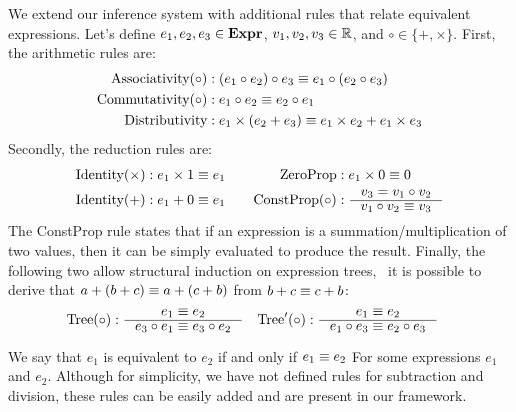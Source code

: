 We extend our inference system with additional rules that relate equivalent
expressions.  Let's define $e_1, e_2, e_3 \in \mathbf{Expr}$, $v_1, v_2, v_3 \in
\mathbb{R}$, and $\circ \in \{+, \times\}$.  First, the arithmetic rules are:
\begin{equation*}
    \begin{aligned}
        \text{Associativity}(\circ)
            &: (e_1 \circ e_2) \circ e_3 \equiv e_1 \circ (e_2 \circ e_3) \\
        \text{Commutativity}(\circ)
            &: e_1 \circ e_2 \equiv e_2 \circ e_1 \\
        \text{Distributivity}
            &: e_1 \times (e_2 + e_3) \equiv e_1 \times e_2 + e_1 \times e_3
    \end{aligned}
\end{equation*}
Secondly, the reduction rules are:
\begin{equation*}
    \begin{aligned}
        \text{Identity}(\times)
            &: e_1 \times 1 \eqrel e_1 \quad &
        \text{ZeroProp}
            &: e_1 \times 0 \eqrel 0 \\
        \text{Identity}(+)
            &: e_1 + 0 \eqrel e_1 &
        \text{ConstProp}(\circ)
            &: \inference{v_3 = v_1 \circ v_2}{v_1 \circ v_2 \eqrel v_3}
    \end{aligned}
\end{equation*}
The ConstProp rule states that if an expression is a summation/multiplication
of two values, then it can be simply evaluated to produce the result. Finally,
the following two allow structural induction on expression trees, \ie~it is
possible to derive that $a + (b + c) \equiv a + (c + b)$ from $b + c \equiv c +
b$:
\begin{equation}
    \begin{aligned}
        \text{Tree}(\circ)
            : \inference{e_1 \eqrel e_2}{e_3 \circ e_1 \eqrel e_3 \circ e_2}
        \quad &
        \text{Tree}^\prime(\circ)
            : \inference{e_1 \eqrel e_2}{e_1 \circ e_3 \eqrel e_2 \circ e_3}
    \end{aligned}
    \label{so:eq:equivalence_inference}
\end{equation}

We say that $e_1$ is equivalent to $e_2$ if and only if $e_1 \equiv e_2$ For
some expressions $e_1$ and $e_2$.  Although for simplicity, we have not defined
rules for subtraction and division, these rules can be easily added and are
present in our framework.



